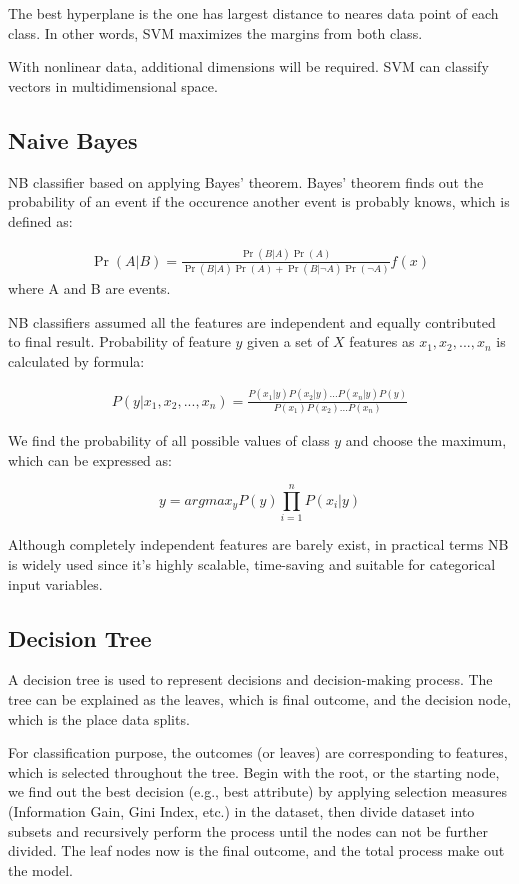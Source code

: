 The best hyperplane is the one has largest distance to neares data point of each class. In other words, SVM maximizes the margins from both class.

With nonlinear data, additional dimensions will be required. SVM can classify vectors in multidimensional space. 

\subsection{Naive Bayes}
NB classifier based on applying Bayes' theorem. Bayes' theorem finds out the probability of an event if the occurence another event is probably knows, which is defined as:

\begin{eqnarray*}
 \Pr(A|B)=\frac{\Pr(B|A)\Pr(A)}{\Pr(B|A)\Pr(A)+\Pr(B|\neg A)\Pr(\neg A)}f(x)
\end{eqnarray*}
where A and B are events.

NB classifiers assumed all the features are independent and equally contributed to final result. Probability of feature $y$ given a set of $X$ features as ${x_{1}, x_{2}, ..., x_{n}}$ is calculated by formula: 

\begin{eqnarray*}
P(y|x_{1}, x_{2}, ..., x_{n}) = \frac{P(x_{1}|y)P(x_{2}|y)...P(x_{n}|y)P(y)}{P(x_{1})P(x_{2})...P(x_{n})}
\end{eqnarray*}

We find the probability of all possible values of class $y$ and choose the maximum, which can be expressed as:

\begin{equation}
    y = argmax_{y}P(y)\prod_{i=1}^{n}P(x_{i}|y)
\end{equation}

Although completely independent features are barely exist, in practical terms NB is widely used since it's highly scalable, time-saving and suitable for categorical input variables.

\subsection{Decision Tree}
A decision tree is used to represent decisions and decision-making process. The tree can be explained as the leaves, which is final outcome, and the decision node, which is the place data splits.

For classification purpose, the outcomes (or leaves) are corresponding to features, which is selected throughout the tree. Begin with the root, or the starting node, we find out the best decision (e.g., best attribute) by applying selection measures (Information Gain, Gini Index, etc.) in the dataset, then divide dataset into subsets and recursively perform the process until the nodes can not be further divided. The leaf nodes now is the final outcome, and the total process make out the model.

